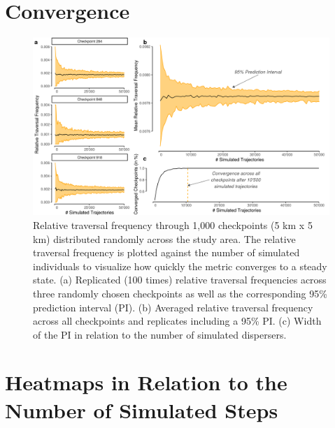 \documentclass[../FinalThesis.tex]{subfiles}
\begin{document}
\newpage
\section{Convergence}

\begin{figure}[!ht]
  \begin{center}
    \includegraphics[width=\textwidth]{Figures/Convergence} \caption{Relative
    traversal frequency through 1,000 checkpoints (5 km x 5 km) distributed
    randomly across the study area. The relative traversal frequency is plotted
    against the number of simulated individuals to visualize how quickly the
    metric converges to a steady state. (a) Replicated (100 times) relative
    traversal frequencies across three randomly chosen checkpoints as well as
    the corresponding 95\% prediction interval (PI). (b) Averaged relative
    traversal frequency across all checkpoints and replicates including a 95\%
    PI. (c) Width of the PI in relation to the number of simulated dispersers.}
    \label{Convergence}
  \end{center}
\end{figure}

\newpage
{}
\section{Heatmaps in Relation to the Number of Simulated Steps}
\end{document}
